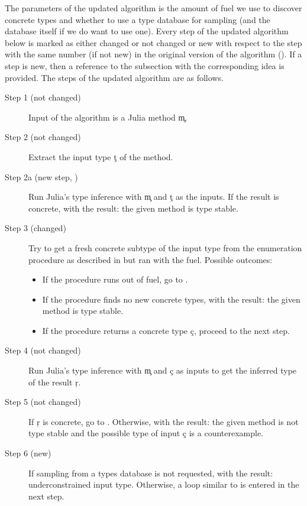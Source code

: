 The parameters of the updated algorithm is the amount of fuel we use to discover
concrete types and whether to use a type database for sampling (and the database
itself if we do want to use one).
Every step of the updated algorithm below is marked as either changed or not
changed or new with respect to the step with the same number (if not new) in the
original version of the algorithm ().
If a step is new, then a reference to the subsection with the corresponding idea is provided.
The steps of the updated algorithm are as follows.
\begin{description}
  \item[Step 1 (not changed)] Input of the algorithm is a Julia method \c{m}.
  \item[Step 2 (not changed)] Extract the input type \c{t} of the method.
  \item[Step 2a (new step, )]
    Run Julia's type inference with \c m and \c t as the
    inputs. If the result is concrete,  with the result: the given
    method is type stable.
  \item[Step 3 (changed)] Try to get a fresh concrete subtype of the input type
    from the enumeration procedure as described in 
    but ran with the fuel. Possible outcomes:
    \begin{itemize}
      \item If the procedure runs out of fuel, go to
        .
      \item If the procedure finds no new concrete types,  with the
      result: the given method is type stable.
      \item If the procedure returns a concrete type \c c, proceed to the next step.
    \end{itemize}
  \item[Step 4 (not changed)] Run Julia’s type inference with \c m and \c c as
    inputs to get the inferred type of the result \c r.
  \item[Step 5 (not changed)]
    If \c r  is concrete, go to . Otherwise, 
    with the result: the given method is not type stable and the possible type
    of input \c c is a counterexample.
  \item[Step 6 (new)]
    If sampling from a types database is not requested,  with
    the result: underconstrained input type.
    Otherwise,
    a loop similar to
     is entered in the next step.

\end{description}
